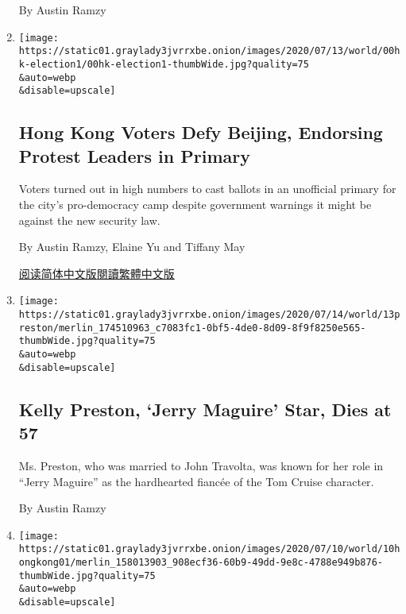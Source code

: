 \begin{enumerate}
  By Austin Ramzy
\item
  \href{/2020/07/13/world/asia/hong-kong-elections-security.html}{}

  \texttt{[image: https://static01.graylady3jvrrxbe.onion/images/2020/07/13/world/00hk-election1/00hk-election1-thumbWide.jpg?quality=75\\\&auto=webp\\\&disable=upscale]}

  \hypertarget{hong-kong-voters-defy-beijing-endorsing-protest-leaders-in-primary}{%
  \subsection{Hong Kong Voters Defy Beijing, Endorsing Protest Leaders
  in
  Primary}\label{hong-kong-voters-defy-beijing-endorsing-protest-leaders-in-primary}}

  Voters turned out in high numbers to cast ballots in an unofficial
  primary for the city's pro-democracy camp despite government warnings
  it might be against the new security law.

  By Austin Ramzy, Elaine Yu and Tiffany May

  \href{https://cn.nytimes3xbfgragh.onion/china/20200714/hong-kong-elections-security/}{阅读简体中文版}\href{https://cn.nytimes3xbfgragh.onion/china/20200714/hong-kong-elections-security/zh-hant/}{閱讀繁體中文版}
\item
  \href{/2020/07/13/movies/kelly-preston-dead.html}{}

  \texttt{[image: https://static01.graylady3jvrrxbe.onion/images/2020/07/14/world/13preston/merlin\_174510963\_c7083fc1-0bf5-4de0-8d09-8f9f8250e565-thumbWide.jpg?quality=75\\\&auto=webp\\\&disable=upscale]}

  \hypertarget{kelly-preston-jerry-maguire-star-dies-at-57}{%
  \subsection{Kelly Preston, `Jerry Maguire' Star, Dies at
  57}\label{kelly-preston-jerry-maguire-star-dies-at-57}}

  Ms. Preston, who was married to John Travolta, was known for her role
  in ``Jerry Maguire'' as the hardhearted fiancée of the Tom Cruise
  character.

  By Austin Ramzy
\item
  \href{/2020/07/10/world/asia/hong-kong-police-raid-pollster.html}{}

  \texttt{[image: https://static01.graylady3jvrrxbe.onion/images/2020/07/10/world/10hongkong01/merlin\_158013903\_908ecf36-60b9-49dd-9e8c-4788e949b876-thumbWide.jpg?quality=75\\\&auto=webp\\\&disable=upscale]}


\end{enumerate}
